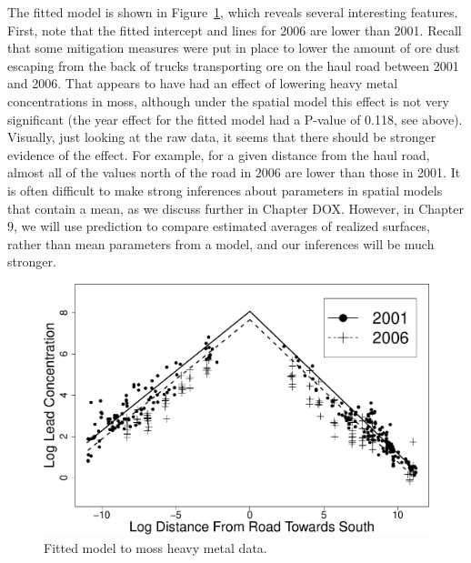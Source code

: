 \documentclass[12pt, titlepage]{article}
\begin{document}
The fitted model is shown in Figure~\ref{Fig:MossModelFit}, which reveals several interesting features.  First, note that the fitted intercept and lines for 2006 are lower than 2001.  Recall that some mitigation measures were put in place to lower the amount of ore dust escaping from the back of trucks transporting ore on the haul road between 2001 and 2006.  That appears to have had an effect of lowering heavy metal concentrations in moss, although under the spatial model this effect is not very significant (the year effect for the fitted model had a P-value of 0.118, see above).  Visually, just looking at the raw data, it seems that there should be stronger evidence of the effect.  For example, for a given distance from the haul road, almost all of the values north of the road in 2006 are lower than those in 2001.  It is often difficult to make strong inferences about parameters in spatial models that contain a mean, as we discuss further in Chapter DOX.  However, in Chapter 9, we will use prediction to compare estimated averages of realized surfaces, rather than mean parameters from a model, and our inferences will be much stronger.

\begin{figure}[H]
  \begin{center}
	    \includegraphics[width=0.9\linewidth]{Moss_modelfit}
  \end{center}
  \caption{Fitted model to moss heavy metal data.  \label{Fig:MossModelFit}}
\end{figure}
\end{document}
